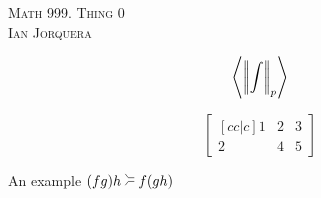 \documentclass[12pt]{amsart}
\begin{document}
\begin{center}
    \textsc{Math 999. Thing 0\\ Ian Jorquera}
\end{center}
\vspace{1em}

$$\ip{\norm{\int}_p}$$


$$\begin{bmatrix}[cc|c]
1 & 2 & 3\\
2 & 4 & 5\end{bmatrix}$$


An example $(fg)h\IansSUperAwesomeSymbolThatICreated f(gh)$
\end{document}
